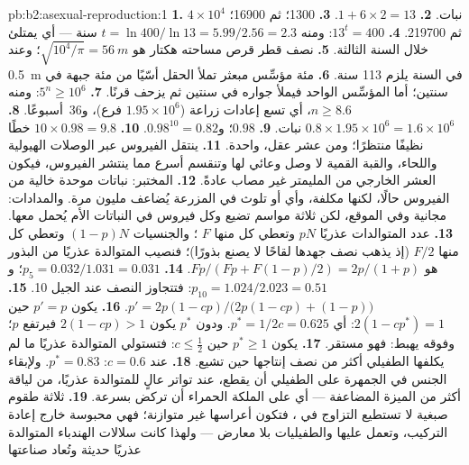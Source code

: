 \begin{solution}{pb:b2:asexual-reproduction:1}
\textbf{1.} $4\times 10^{4}$ نبات.
\textbf{2.} $1 + 6\times 2 = 13$.
\textbf{3.} \num{1300}؛ ثم \num{16900}؛ ثم \num{219700}.
\textbf{4.} $13^{t} = 400$: ومنه $t = \ln 400/\ln 13 = 5.99/2.56 = 2.3$
سنة --- أي يمتلئ خلال السنة الثالثة.
\textbf{5.} نصف قطر قرص مساحته هكتار هو $\sqrt{10^{4}/\pi} = \qty{56}{m}$؛
وعند \qty{0.5}{m} في السنة يلزم \num{113} سنة.
\textbf{6.} مئة مؤسِّس مبعثر تملأ الحقل أسّيًا
من مئة جبهة في سنتين؛ أما المؤسِّس الواحد فيملأ جواره
في سنتين ثم يزحف قرنًا.
\textbf{7.} $5^{n} \ge 10^{6}$: ومنه $n \ge 8.6$، أي تسع إعادات زراعة
($1.95\times 10^{6}$ فرع)، و36~أسبوعًا.
\textbf{8.} $0.8\times 1.95\times 10^{6} = 1.6\times 10^{6}$ نبات.
\textbf{9.} $0.98$؛ و$0.98^{10} = 0.82$.
\textbf{10.} $10\times 0.98 = 9.8$ خطًا نظيفًا منتظرًا؛ ومن عشر
عقل، واحدة.
\textbf{11.} ينتقل الفيروس عبر الوصلات الهيولية واللحاء،
والقبة القمية لا وصل وعائي لها وتنقسم أسرع
مما ينتشر الفيروس، فيكون العشر الخارجي من المليمتر
غير مصاب عادةً.
\textbf{12.} المختبر: نباتات موحدة خالية من الفيروس حالًا، لكنها
مكلفة، وأي  أو تلوث في المزرعة يُضاعف
مليون مرة. والمدادات: مجانية وفي الموقع، لكن ثلاثة
مواسم تضيع وكل فيروس في النباتات الأم يُحمل معها.
\textbf{13.} عدد المتوالدات عذريًا $pN$ وتعطي كل منها $F$ ؛ والجنسيات
$(1 - p)N$ وتعطي كل منها $F/2$  (إذ يذهب نصف جهدها لقاحًا لا
يصنع بذورًا)؛ فنصيب المتوالدة عذريًا من البذور هو $Fp/(Fp + F(1 - p)/2)
= 2p/(1 + p)$.
\textbf{14.} $p_5 = 0.032/1.031 = 0.031$؛ و$p_{10} = 1.024/2.023 =
0.51$: فتتجاوز النصف عند الجيل 10.
\textbf{15.} $p' = 2p(1 - cp)/\bigl(2p(1 - cp) + (1 - p)\bigr)$.
\textbf{16.} يكون $p' = p$ حين $2(1 - cp^*) = 1$: أي $p^* = 1/2c = 0.625$.
ودون $p^*$ يكون $2(1 - cp) > 1$ فيرتفع $p$؛ وفوقه يهبط: فهو مستقر.
\textbf{17.} يكون $p^* \ge 1$ حين $c \le \tfrac12$: فتستولي المتوالدة عذريًا
ما لم يكلفها الطفيلي أكثر من نصف إنتاجها حين تشيع.
\textbf{18.} عند $c = 0.6$: $p^* = 0.83$. ولإبقاء الجنس في الجمهرة
على الطفيلي أن يقطع، عند تواتر عالٍ للمتوالدة عذريًا، من لياقة
 أكثر من الميزة المضاعفة --- أي على الملكة الحمراء أن
تركض بسرعة.
\textbf{19.} ثلاثة طقوم صبغية لا تستطيع التزاوج في ،
فتكون أعراسها غير متوازنة؛ فهي محبوسة خارج إعادة التركيب،
وتعمل عليها  والطفيليات بلا معارض --- ولهذا
كانت سلالات الهندباء المتوالدة عذريًا حديثة وتُعاد صناعتها

\end{solution}
